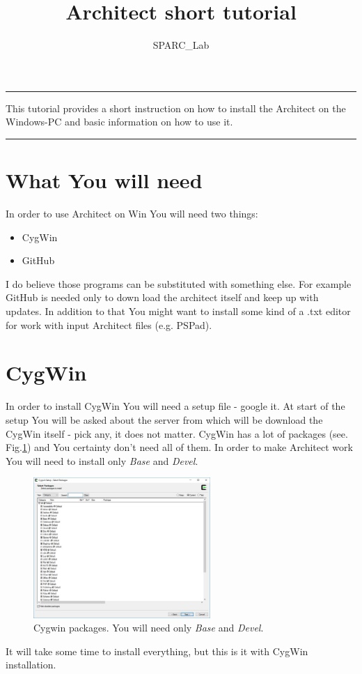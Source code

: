 \documentclass[12pt,a4paper]{article}
\renewenvironment{abstract}{%
\hfill\begin{minipage}{0.95\textwidth}
\rule{\textwidth}{1pt}}
{\par\noindent\rule{\textwidth}{1pt}\end{minipage}}
\begin{document}
%
\title{Architect short tutorial}
\author[1]{SPARC\_Lab}
%
\maketitle
%
\begin{abstract}
This tutorial provides a short instruction on how to install the Architect on the Windows-PC and basic information on how to use it. 
\end{abstract}
\section*{What You will need}

In order to use Architect on Win You will need two things:
\begin{itemize}
\item{CygWin}
\item{GitHub}
\end{itemize}

I do believe those programs can be substituted with something else. For example GitHub is needed only to down load the architect itself and keep up with updates. In addition to that You might want to install some kind of a .txt editor for work with input Architect files (e.g. PSPad).
\section{CygWin}
In order to install CygWin You will need a setup file - google it. At start of the setup You will be asked about the server from which will be download the CygWin itself - pick any, it does not matter. CygWin has a lot of packages (see. Fig.\ref{fig1}) and You certainty don't need all of them. In order to make Architect work You will need to install only \textit{Base} and \textit{Devel}.

\begin{figure}[h]
\centering
\includegraphics[width=0.6\textwidth]{CygWin_Packages.jpg}
\caption{Cygwin packages. You will need only \textit{Base} and \textit{Devel}.}
\label{fig1}
\end{figure}
It will take some time to install everything, but this is it with CygWin installation.
\end{document}

